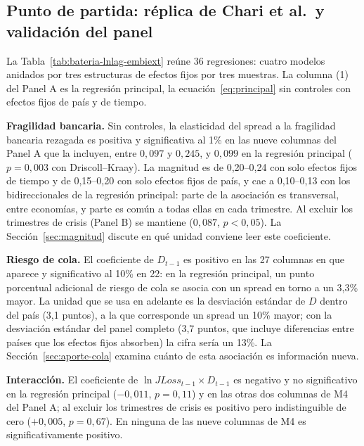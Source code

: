 \subsection{Punto de partida: réplica de Chari et al.\ y validación del panel}
\label{sec:bateria}

La Tabla~\ref{tab:bateria-lnlag-embiext} reúne 36 regresiones: cuatro modelos anidados por tres estructuras de efectos fijos por tres muestras. La columna (1) del Panel A es la regresión principal, la ecuación~\eqref{eq:principal} sin controles con efectos fijos de país y de tiempo.



\textbf{Fragilidad bancaria.} Sin controles, la elasticidad del spread a la fragilidad bancaria rezagada es positiva y significativa al 1\% en las nueve columnas del Panel A que la incluyen, entre $0{,}097$ y $0{,}245$, y $0{,}099$ en la regresión principal ($p=0{,}003$ con Driscoll--Kraay). La magnitud es de 0,20--0,24 con solo efectos fijos de tiempo y de 0,15--0,20 con solo efectos fijos de país, y cae a 0,10--0,13 con los bidireccionales de la regresión principal: parte de la asociación es transversal, entre economías, y parte es común a todas ellas en cada trimestre. Al excluir los trimestres de crisis (Panel B) se mantiene ($0{,}087$, $p<0{,}05$). La Sección~\ref{sec:magnitud} discute en qué unidad conviene leer este coeficiente.

\textbf{Riesgo de cola.} El coeficiente de $D_{t-1}$ es positivo en las 27 columnas en que aparece y significativo al 10\% en 22: en la regresión principal, un punto porcentual adicional de riesgo de cola se asocia con un spread en torno a un 3,3\% mayor. La unidad que se usa en adelante es la desviación estándar de $D$ dentro del país (3,1 puntos), a la que corresponde un spread un 10\% mayor; con la desviación estándar del panel completo (3,7 puntos, que incluye diferencias entre países que los efectos fijos absorben) la cifra sería un 13\%. La Sección~\ref{sec:aporte-cola} examina cuánto de esta asociación es información nueva.

\textbf{Interacción.} El coeficiente de $\ln JLoss_{t-1}\times D_{t-1}$ es negativo y no significativo en la regresión principal ($-0{,}011$, $p=0{,}11$) y en las otras dos columnas de M4 del Panel A; al excluir los trimestres de crisis es positivo pero indistinguible de cero ($+0{,}005$, $p=0{,}67$). En ninguna de las nueve columnas de M4 es significativamente positivo.

